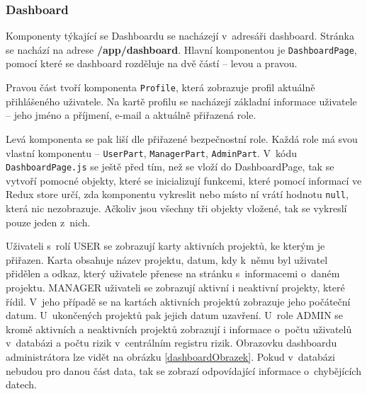  


\subsubsection *{Dashboard}

Komponenty týkající se Dashboardu se nacházejí v~adresáři dashboard. Stránka se nachází na adrese \textbf{/app/dashboard}. Hlavní komponentou je \texttt{DashboardPage}, pomocí které se dashboard rozděluje na dvě částí – levou a pravou. 

Pravou část tvoří komponenta \texttt{Profile}, která zobrazuje profil aktuálně přihlášeného uživatele. Na kartě profilu se nacházejí základní informace uživatele – jeho jméno a příjmení, e-mail a aktuálně přiřazená role. 

Levá komponenta se pak liší dle přiřazené bezpečnostní role. Každá role má svou vlastní komponentu – \texttt{UserPart}, \texttt{ManagerPart}, \texttt{AdminPart}. V~kódu \texttt{DashboardPage.js} se ještě před tím, než se vloží do DashboardPage, tak se vytvoří pomocné objekty, které se inicializují funkcemi, které pomocí informací ve Redux store určí, zda komponentu vykreslit nebo místo ní vrátí hodnotu \texttt{null}, která nic nezobrazuje. Ačkoliv jsou všechny tři objekty vložené, tak se vykreslí pouze jeden z~nich. 

Uživateli s~rolí USER se zobrazují karty aktivních projektů, ke kterým je přiřazen. Karta obsahuje název projektu, datum, kdy k~němu byl uživatel přidělen a odkaz, který uživatele přenese na stránku s~informacemi o~daném projektu. MANAGER uživateli se zobrazují aktivní i neaktivní projekty, které řídil. V~jeho případě se na kartách aktivních projektů zobrazuje jeho počáteční datum. U~ukončených projektů pak jejich datum uzavření. U~role ADMIN se kromě aktivních a neaktivních projektů zobrazují i informace o~počtu uživatelů v~databázi a počtu rizik v~centrálním registru rizik. Obrazovku dashboardu administrátora lze vidět na obrázku \ref{dashboardObrazek}. Pokud v~databázi nebudou pro danou část data, tak se zobrazí odpovídající informace o~chybějících datech.

